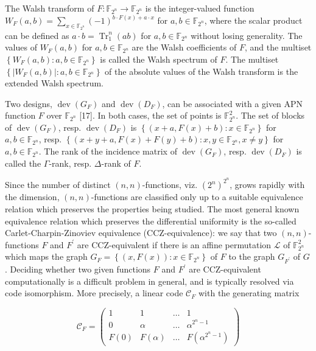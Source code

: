 \documentclass[10pt]{article}
\begin{document}
The Walsh transform of $F: \mathbb{F}_{2^{n}} \rightarrow \mathbb{F}_{2^{n}}$ is the integer-valued function $W_{F}(a, b)=\sum_{x \in \mathbb{F}_{2^{n}}}(-1)^{b \cdot F(x)+a \cdot x}$ for $a, b \in \mathbb{F}_{2^{n}}$, where the scalar product can be defined as $a \cdot b=\operatorname{Tr}_{1}^{n}(a b)$ for $a, b \in \mathbb{F}_{2^{n}}$ without losing generality. The values of $W_{F}(a, b)$ for $a, b \in \mathbb{F}_{2^{n}}$ are the Walsh coefficients of $F$, and the multiset $\left\{W_{F}(a, b): a, b \in \mathbb{F}_{2^{n}}\right\}$ is called the Walsh spectrum of $F$. The multiset $\left\{\left|W_{F}(a, b)\right|: a, b \in \mathbb{F}_{2^{n}}\right\}$ of the absolute values of the Walsh transform is the extended Walsh spectrum.

Two designs, $\operatorname{dev}\left(G_{F}\right)$ and $\operatorname{dev}\left(D_{F}\right)$, can be associated with a given APN function $F$ over $\mathbb{F}_{2^{n}}$ [17]. In both cases, the set of points is $\mathbb{F}_{2^{n}}^{2}$. The set of blocks of $\operatorname{dev}\left(G_{F}\right)$, resp. $\operatorname{dev}\left(D_{F}\right)$ is $\left\{(x+a, F(x)+b): x \in \mathbb{F}_{2^{n}}\right\}$ for $a, b \in \mathbb{F}_{2^{n}}$, resp. $\left\{(x+y+a, F(x)+F(y)+b): x, y \in \mathbb{F}_{2^{n}}, x \neq y\right\}$ for $a, b \in \mathbb{F}_{2^{n}}$. The rank of the incidence matrix of $\operatorname{dev}\left(G_{F}\right)$, resp. $\operatorname{dev}\left(D_{F}\right)$ is called the $\Gamma$-rank, resp. $\Delta$-rank of $F$.

Since the number of distinct $(n, n)$-functions, viz. $\left(2^{n}\right)^{2^{n}}$, grows rapidly with the dimension, $(n, n)$-functions are classified only up to a suitable equivalence relation which preserves the properties being studied. The most general known equivalence relation which preserves the differential uniformity is the so-called Carlet-Charpin-Zinoviev equivalence (CCZ-equivalence): we say that two $(n, n)$-functions $F$ and $F^{\prime}$ are CCZ-equivalent if there is an affine permutation $\mathcal{L}$ of $\mathbb{F}_{2^{n}}^{2}$ which maps the graph $G_{F}=\left\{(x, F(x)): x \in \mathbb{F}_{2^{n}}\right\}$ of $F$ to the graph $G_{F^{\prime}}$ of $G$. Deciding whether two given functions $F$ and $F^{\prime}$ are CCZ-equivalent computationally is a difficult problem in general, and is typically resolved via code isomorphism. More precisely, a linear code $\mathcal{C}_{F}$ with the generating matrix

$$
\mathcal{C}_{F}=\left(\begin{array}{cccc}
1 & 1 & \ldots & 1 \\
0 & \alpha & \ldots & \alpha^{2^{n}-1} \\
F(0) & F(\alpha) & \ldots & F\left(\alpha^{2^{n}-1}\right)
\end{array}\right)
$$
\end{document}
